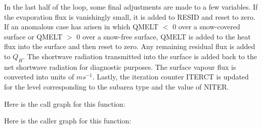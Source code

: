 In the last half of the loop, some final adjustments are made to a few variables. If the evaporation flux is vanishingly small, it is added to R\+E\+S\+I\+D and reset to zero. If an anomalous case has arisen in which Q\+M\+E\+L\+T $<$ 0 over a snow-\/covered surface or Q\+M\+E\+L\+T $>$ 0 over a snow-\/free surface, Q\+M\+E\+L\+T is added to the heat flux into the surface and then reset to zero. Any remaining residual flux is added to $Q_H$. The shortwave radiation transmitted into the surface is added back to the net shortwave radiation for diagnostic purposes. The surface vapour flux is converted into units of $m s^{-1}$. Lastly, the iteration counter I\+T\+E\+R\+C\+T is updated for the level corresponding to the subarea type and the value of N\+I\+T\+E\+R.

Here is the call graph for this function\+:




Here is the caller graph for this function\+:


